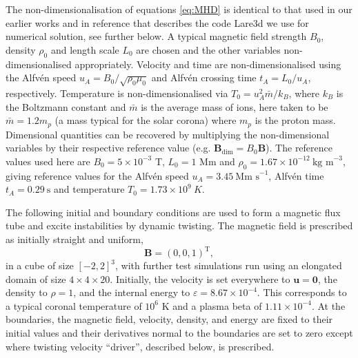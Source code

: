 \documentclass[fleqn,usenatbib]{mnras}
\newcommand{\rs}[2]{{#2}}
\renewcommand{\vec}[1]{{\bm #1}}
\begin{document}
\rs{The non-dimensionalisation scheme and values align with the scheme
used by Lare3d~\citep{arberStaggeredGridLagrangian2001} and are
identical to those used
in~\citep{quinnEffectAnisotropicViscosity2020}.}
   {
The non-dimensionalisation of equations \eqref{eq:MHD} is identical to that used in
our earlier works
\citep{quinnEffectAnisotropicViscosity2020,quinnKelvinHelmholtzInstabilityCollapse2021} and in reference
\citep{arberStaggeredGridLagrangian2001} that describes the code Lare3d
we use for numerical solution, see further below. A typical magnetic
field strength $B_0$, density $\rho_0$ and length scale $L_0$ are
chosen and the other variables non-dimensionalised
appropriately. Velocity and time are non-dimensionalised using the
Alfv\'en speed $u_A = B_0 / \sqrt{\rho_0 \mu_0}$ and Alfv\'en crossing 
time $t_A = L_0/u_A$, respectively. Temperature is non-dimensionalised
via $T_0 = u_A^2 \bar{m} / k_B$, where $k_B$ is the Boltzmann constant
and $\bar{m}$ is the average mass of ions, here taken to be $\bar{m} =
1.2m_p$ (a mass typical for the solar corona) where $m_p$ is the
proton mass. Dimensional quantities can be recovered by multiplying
the non-dimensional variables by their respective reference value
(e.g. $\vec{B}_{\dim} = B_0 \vec{B}$). The reference values used here
are $B_0 = 5 \times 10^{-3}$ T, $L_0 = 1$ Mm and $\rho_0 = 1.67 \times
10^{-12} \ \text{kg m}^{-3}$, giving reference values for the Alfv\'en
speed $u_A = 3.45\ \text{Mm s}^{-1}$, Alfv\'en time $t_A =
0.29\ \text{s}$ and temperature $T_0 = 1.73 \times 10^{9}\ K$.      
   }



\rs{}{The following initial and boundary conditions are used to form a
magnetic flux tube and excite instabilities by dynamic twisting.} 
The magnetic field is prescribed as initially straight and uniform,
\begin{equation}
\vec{B} = (0, 0, 1)^{\text{T}},
\end{equation}
in a cube of \rs{dimension}{size} $[-2,2]^3$, with further test simulations run using an elongated domain of size $4\times4\times20$. \rs{The}{Initially, the} velocity is set
everywhere to $\vec{u} = \vec{0}$, the density to $\rho = 1$,
\rs{}{and} the
internal energy to $\varepsilon = 8.67\times 10^{-4}$. This corresponds
to a typical coronal temperature of $10^6$ K and a plasma beta of $1.11 \times 10^{-4}$. At the
boundaries, the magnetic field, \rs{}{velocity,} density, and energy are fixed to their
initial values \rs{}{and their derivatives normal to the
boundaries are set to zero} \rs{and the velocity to zero}{} except
\rs{the boundaries}{where twisting velocity ``driver''}, described
below, is prescribed.
\rs{The spatial
derivatives of these variables are also set to zero at the
boundaries.}{} \rs{The resolution is $512$ grid points per dimension,
comparable to the highest resolution kink instability studies
of~\cite{hoodCoronalHeatingMagnetic2009} or medium resolution studies
of~\cite{barefordShockHeatingNumerical2015}.}{}
\end{document}
